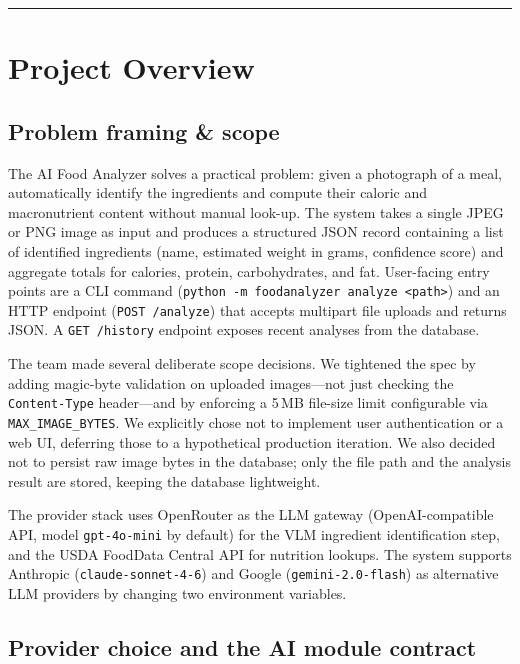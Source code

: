 \documentclass[11pt,a4paper]{article}
\begin{document}
\tableofcontents
\vspace{0.6em}\hrule\vspace{0.4em}

\section{Project Overview}

\subsection{Problem framing \& scope}

The AI Food Analyzer solves a practical problem: given a photograph of a meal, automatically identify the ingredients and compute their caloric and macronutrient content without manual look-up. The system takes a single JPEG or PNG image as input and produces a structured JSON record containing a list of identified ingredients (name, estimated weight in grams, confidence score) and aggregate totals for calories, protein, carbohydrates, and fat. User-facing entry points are a CLI command (\texttt{python -m foodanalyzer analyze <path>}) and an HTTP endpoint (\texttt{POST /analyze}) that accepts multipart file uploads and returns JSON. A \texttt{GET /history} endpoint exposes recent analyses from the database.

The team made several deliberate scope decisions. We tightened the spec by adding magic-byte validation on uploaded images---not just checking the \texttt{Content-Type} header---and by enforcing a 5\,MB file-size limit configurable via \texttt{MAX\_IMAGE\_BYTES}. We explicitly chose not to implement user authentication or a web UI, deferring those to a hypothetical production iteration. We also decided not to persist raw image bytes in the database; only the file path and the analysis result are stored, keeping the database lightweight.

The provider stack uses OpenRouter as the LLM gateway (OpenAI-compatible API, model \texttt{gpt-4o-mini} by default) for the VLM ingredient identification step, and the USDA FoodData Central API for nutrition lookups. The system supports Anthropic (\texttt{claude-sonnet-4-6}) and Google (\texttt{gemini-2.0-flash}) as alternative LLM providers by changing two environment variables.

\subsection{Provider choice and the AI module contract}
\end{document}
